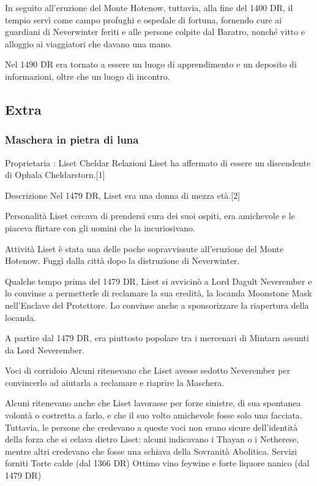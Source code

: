 \documentclass{article}
\begin{document}
In seguito all'eruzione del Monte Hotenow, tuttavia, alla fine del 1400 DR, il tempio servì come campo profughi e ospedale di fortuna, fornendo cure ai guardiani di Neverwinter feriti e alle persone colpite dal Baratro, nonché vitto e alloggio ai viaggiatori che davano una mano.

Nel 1490 DR era tornato a essere un luogo di apprendimento e un deposito di informazioni, oltre che un luogo di incontro.



          \subsection{Extra}
              \subsubsection{Maschera in pietra di luna}
Proprietaria : Liset Cheldar
Relazioni
Liset ha affermato di essere un discendente di Ophala Cheldarstorn.[1]

Descrizione\newline
Nel 1479 DR, Liset era una donna di mezza età.[2]

Personalità\newline
Liset cercava di prendersi cura dei suoi ospiti, era amichevole e le piaceva flirtare con gli uomini che la incuriosivano.

Attività\newline
Liset è stata una delle poche sopravvissute all'eruzione del Monte Hotenow. Fuggì dalla città dopo la distruzione di Neverwinter.

Qualche tempo prima del 1479 DR, Liset si avvicinò a Lord Dagult Neverember e lo convinse a permetterle di reclamare la sua eredità, la locanda Moonstone Mask nell'Enclave del Protettore. Lo convinse anche a sponsorizzare la riapertura della locanda.

A partire dal 1479 DR, era piuttosto popolare tra i mercenari di Mintarn assunti da Lord Neverember.

Voci di corridoio\newline
Alcuni ritenevano che Liset avesse sedotto Neverember per convincerlo ad aiutarla a reclamare e riaprire la Maschera.

Alcuni ritenevano anche che Liset lavorasse per forze sinistre, di sua spontanea volontà o costretta a farlo, e che il suo volto amichevole fosse solo una facciata. Tuttavia, le persone che credevano a queste voci non erano sicure dell'identità della forza che si celava dietro Liset: alcuni indicavano i Thayan o i Netherese, mentre altri credevano che fosse una schiava della Sovranità Abolitica.
\newline
Servizi forniti
Torte calde (dal 1366 DR)
Ottimo vino feywine e forte liquore nanico (dal 1479 DR)
\end{document}
